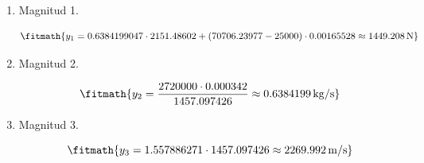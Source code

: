 \begin{enumerate}

\item Magnitud 1.

\[\fitmath{y_{1}=0.6384199047\cdot 2151.48602+\left(70706.23977-25000\right)\cdot 0.00165528\approx 1449.208\,\mathrm{N}}\]

\item Magnitud 2.

\[\fitmath{y_{2}=\frac{2720000\cdot 0.000342}{1457.097426}\approx 0.6384199\,\mathrm{kg/s}}\]

\item Magnitud 3.

\[\fitmath{y_{3}=1.557886271\cdot 1457.097426\approx 2269.992\,\mathrm{m/s}}\]

\end{enumerate}
